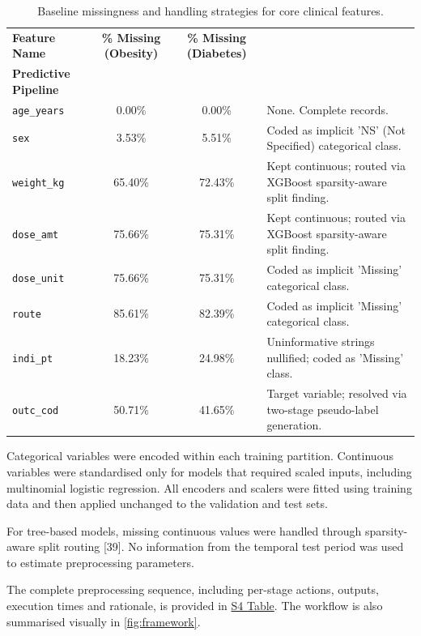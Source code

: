 \documentclass[10pt]{article}
\begin{document}
\begin{table}[htbp]
\caption{Baseline missingness and handling strategies for core clinical features.}
\label{tab:missingness}
\centering\small\setlength{\tabcolsep}{8pt}
\begin{tabularx}{\textwidth}{|l|c|c|>{\raggedright\arraybackslash}X|}
\hline
\textbf{Feature Name} & 
\textbf{\% Missing (Obesity)} & 
\textbf{\% Missing (Diabetes)} & 
\makecell[c]{\textbf{Handling Strategy in} \\ \textbf{Predictive Pipeline}}\\
\hline
\texttt{age\_years} & 0.00\% & 0.00\% & None. Complete records. \\
\hline
\texttt{sex} & 3.53\% & 5.51\% & Coded as implicit 'NS' (Not Specified) categorical class. \\
\hline
\texttt{weight\_kg} & 65.40\% & 72.43\% & Kept continuous; routed via XGBoost sparsity-aware split finding. \\
\hline
\texttt{dose\_amt} & 75.66\% & 75.31\% & Kept continuous; routed via XGBoost sparsity-aware split finding. \\
\hline
\texttt{dose\_unit} & 75.66\% & 75.31\% & Coded as implicit 'Missing' categorical class. \\
\hline
\texttt{route} & 85.61\% & 82.39\% & Coded as implicit 'Missing' categorical class. \\
\hline
\texttt{indi\_pt} & 18.23\% & 24.98\% & Uninformative strings nullified; coded as 'Missing' class. \\
\hline
\texttt{outc\_cod} & 50.71\% & 41.65\% & Target variable; resolved via two-stage pseudo-label generation. \\
\hline
\end{tabularx}
\end{table}

Categorical variables were encoded within each training partition. Continuous variables were standardised only for models that required scaled inputs, including multinomial logistic regression. All encoders and scalers were fitted using training data and then applied unchanged to the validation and test sets.

For tree-based models, missing continuous values were handled through sparsity-aware split routing [39]. No information from the temporal test period was used to estimate preprocessing parameters.

The complete preprocessing sequence, including per-stage actions, outputs, execution times and rationale, is provided in \hyperref[s4tab]{S4 Table}. The workflow is also summarised visually in \cref{fig:framework}.
\end{document}
